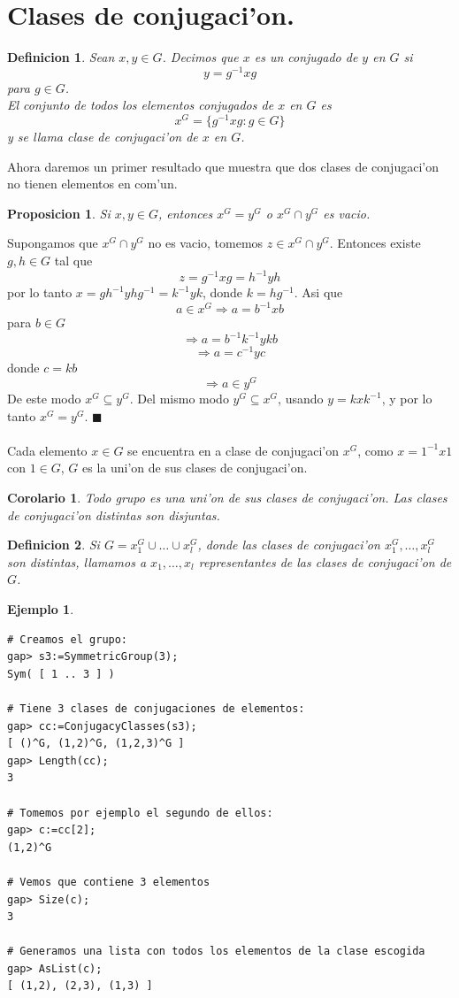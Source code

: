 \documentclass[a4paper,openright,12pt]{book}
\numberwithin{equation}{section} %
\newtheorem{proposicion}{Proposicion}[section] %
\newtheorem{corolario}{Corolario}[section] %
\newtheorem{definicion}{Definicion}[section] %
\newtheorem{ejemplo}{Ejemplo}[section] %
\newenvironment{proof}{\noindent{\it Demostracion:}}{\hfill$\blacksquare$} %
\begin{document}
\section{Clases de conjugaci'on.}
\begin{definicion}
Sean $x, y \in G$. Decimos que $x$ es un conjugado de $y$ en $G$ si 
\[
y=g^{-1}xg
\]
para $g \in G$.\\
El conjunto de todos los elementos conjugados de $x$ en $G$ es
\[
x^{G}=\{g^{-1}xg : g \in G \}
\]
y se llama clase de conjugaci'on de $x$ en $G$.
\end{definicion}
Ahora daremos un primer resultado que muestra que dos clases de conjugaci'on no tienen elementos en com'un.
\begin{proposicion}
Si $x, y \in G$, entonces $x^{G}=y^{G}$ o $x^{G} \cap y^{G}$ es vacio.
\end{proposicion} 
\begin{proof}
Supongamos que $x^{G} \cap y^{G}$ no es vacio, tomemos $z \in x^{G} \cap y^{G}$. Entonces existe $g, h \in G$ tal que 
\[
z=g^{-1}xg = h^{-1}yh
\]
por lo tanto $x=gh^{-1}yhg^{-1}=k^{-1}yk $, donde $k=hg^{-1}$. Asi que
\[
a \in x^{G} \Rightarrow a=b^{-1}xb
\]
para $b \in G$
\[
\Rightarrow a=b^{-1}k^{-1}ykb
\]
\[
\Rightarrow a=c^{-1}yc
\]
donde $c=kb$ 
\[
\Rightarrow a \in y^{G}
\]
De este modo $x^{G} \subseteq y^{G}$. Del mismo modo $y^{G} \subseteq x^{G}$, usando $y=kxk^{-1}$, y por lo tanto $x^{G}=y^{G}$.
\end{proof}\\
\\
Cada elemento $x \in G$ se encuentra en a clase de conjugaci'on $x^{G}$, como $x=1^{-1}x1$ con $1 \in G$, $G$ es la uni'on de sus clases de conjugaci'on.
\begin{corolario}
Todo grupo es una uni'on de sus clases de conjugaci'on. Las clases de conjugaci'on distintas son disjuntas.
\end{corolario}
\begin{definicion}
Si $G=x_{1}^{G} \cup \ldots \cup x_{l}^{G}$, donde las clases de conjugaci'on $x_{1}^{G}, \ldots , x_{l}^{G}$ son distintas, llamamos a $x_{1}, \ldots , x_{l}$ representantes de las clases de conjugaci'on de $G$.
\end{definicion}
\begin{ejemplo}

\end{ejemplo}
\begin{verbatim}
# Creamos el grupo:
gap> s3:=SymmetricGroup(3);
Sym( [ 1 .. 3 ] )

# Tiene 3 clases de conjugaciones de elementos:
gap> cc:=ConjugacyClasses(s3);
[ ()^G, (1,2)^G, (1,2,3)^G ]
gap> Length(cc);
3

# Tomemos por ejemplo el segundo de ellos:
gap> c:=cc[2];
(1,2)^G

# Vemos que contiene 3 elementos
gap> Size(c);
3

# Generamos una lista con todos los elementos de la clase escogida
gap> AsList(c);
[ (1,2), (2,3), (1,3) ]
\end{verbatim}
\end{document}

